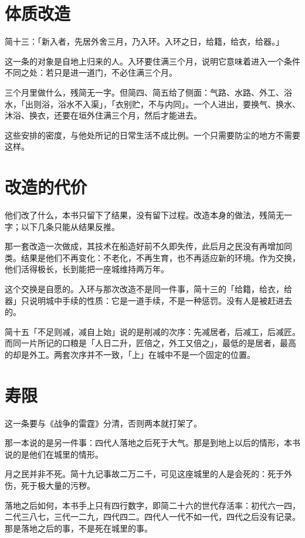 \section{体质改造}

简十三：「新入者，先居外舍三月，乃入环。入环之日，给籍，给衣，给器。」

这一条的对象是自地上归来的人。入环要住满三个月，说明它意味着进入一个条件不同之处：若只是进一道门，不必住满三个月。

三个月里做什么，残简无一字。但简四、简五给了侧面：气路、水路、外工、浴水，「出则浴，浴水不入渠」，「衣别贮，不与内同」。一个人进出，要换气、换水、沐浴、换衣，还要在垣外住满三个月，然后才能进去。

这些安排的密度，与他处所记的日常生活不成比例。一个只需要防尘的地方不需要这样。

\section{改造的代价}

他们改了什么，本书只留下了结果，没有留下过程。改造本身的做法，残简无一字；以下几条只能从结果反推。

那一套改造一次做成，其技术在船造好前不久即失传，此后月之民没有再增加同类。结果是他们不再变化：不老化，不再生育，也不再适应新的环境。作为交换，他们活得极长，长到能把一座城维持两万年。

这个交换是自愿的。入环与那次改造不是同一件事，简十三的「给籍，给衣，给器」只说明城中手续的性质：它是一道手续，不是一种惩罚。没有人是被赶进去的。

简十五「不足则减，减自上始」说的是削减的次序：先减居者，后减工，后减匠。而同一片所记的口粮是「人日二升，匠倍之，外工又倍之」，最低的是居者，最高的却是外工。两套次序并不一致，「上」在城中不是一个固定的位置。

\section{寿限}

这一条要与《战争的雷霆》分清，否则两本就打架了。

那一本说的是另一件事：四代人落地之后死于大气。那是到地上以后的情形，本书说的是他们在城里的情形。

月之民并非不死。简十九记事故二万二千，可见这座城里的人是会死的：死于外伤，死于极大量的污秽。

落地之后如何，本书手上只有四行数字，即简二十六的世代存活率：初代六一四，二代三八七，三代一二九，四代四二。四代人一代不如一代，四代之后没有记录。那是落地之后的事，不是死在城里的事。

